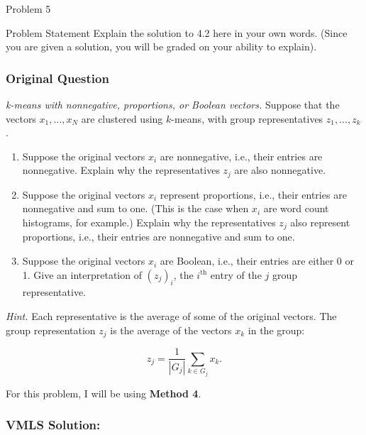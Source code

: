 \begin{problem}{Problem 5}
    \begin{statement}{Problem Statement}
        Explain the solution to 4.2 here in your own words. (Since you are given a solution, you will be graded on your ability to explain).

        \subsubsection*{Original Question}

        \textit{k-means with nonnegative, proportions, or Boolean vectors.} Suppose that the vectors $x_{1}, \dots, x_{N}$ are clustered using $k$-means, with group representatives $z_{1}, \dots, z_{k}$.

        \begin{enumerate}[label = (\alph*)]
            \item Suppose the original vectors $x_{i}$ are nonnegative, i.e., their entries are nonnegative. Explain why the representatives $z_{j}$ are also nonnegative.
            \item Suppose the original vectors $x_{i}$ represent proportions, i.e., their entries are nonnegative and sum to one. (This is the case when $x_{i}$ are word count histograms, for example.) 
            Explain why the representatives $z_{j}$ also represent proportions, i.e., their entries are nonnegative and sum to one.
            \item Suppose the original vectors $x_{i}$ are Boolean, i.e., their entries are either 0 or 1. Give an interpretation of $(z_{j})_{i}$, the $i^{\text{th}}$ entry of the $j$ group representative.
        \end{enumerate}
        \textit{Hint.} Each representative is the average of some of the original vectors. The group representation $z_{j}$ is the average of the vectors $x_{k}$ in the group:

        \begin{equation*}
            z_{j} = \frac{1}{|G_{j}|} \sum_{k \in G_{j}} x_{k}.
        \end{equation*}
    \end{statement}

    \begin{highlight}
        \noindent For this problem, I will be using \textbf{Method 4}. 

        \subsubsection*{VMLS Solution:}


\end{highlight}
\end{problem}
